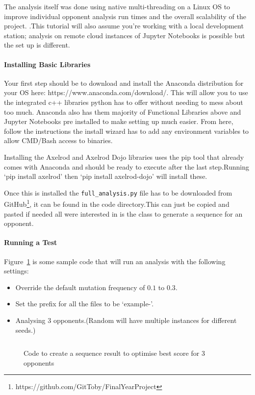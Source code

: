 The analysis itself was done using native multi-threading on a Linux OS to improve individual opponent analysis run times and the overall scalability of the project.
.This tutorial will also assume you're working with a local development station;
analysis on remote cloud instances of Jupyter Notebooks is possible but the set up is different.

\paragraph{Installing Basic Libraries}
Your first step should be to download and install the Anaconda distribution for your OS here: https://www.anaconda.com/download/.
This will allow you to use the integrated c++ libraries python has to offer without needing to mess about too much.
Anaconda also has them majority of Functional Libraries above and Jupyter Notebooks pre installed to make setting up much easier.
From here, follow the instructions the install wizard has to add any environment variables to allow CMD/Bash access to binaries.

Installing the Axelrod and Axelrod Dojo libraries uses the pip tool that already comes with Anaconda and should be ready to execute after the last step.Running `pip install axelrod' then `pip install axelrod-dojo' will install these.

Once this is installed the \texttt{full\_analysis.py} file has to be downloaded from GitHub\footnote{https://github.com/GitToby/FinalYearProject}, it can be found in the code directory.This can just be copied and pasted if needed all were interested in is the class to generate a sequence for an opponent.

\paragraph{Running a Test}
Figure~\ref{code:analysisExample} is some sample code that will run an analysis with the following settings:
\begin{itemize}
    \item Override the default mutation frequency of \(0.1\) to \(0.3\).
    \item Set the prefix for all the files to be `example-'.
    \item Analysing 3 opponents.(Random will have multiple instances for different seeds.) 
\end{itemize}
\begin{figure}[ht]
    \centering
    \inputminted{python}{code_snippets/analysisExample.py}
    \caption{Code to create a sequence result to optimise best score for 3 opponents}\label{code:analysisExample}
\end{figure}

